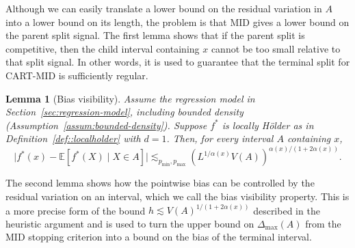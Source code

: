 \documentclass[11pt]{article}
\theoremstyle{plain}
\newtheorem{lemma}[theorem]{Lemma}
\theoremstyle{definition}
\theoremstyle{remark}
\theoremstyle{plain}
\newcommand{\E}{\mathbb{E}}
\newcommand{\1}{\mathbbm{1}}
\begin{document}
Although we can easily translate a lower bound on the residual variation in $A$ into a lower bound on its length, the problem is that MID gives a lower bound on the parent split signal. The first lemma shows that if the parent split is competitive, then the child interval containing $x$ cannot be too small relative to that split signal.
In other words, it is used to guarantee that the terminal split for CART-MID is sufficiently regular.


\begin{lemma}[Bias visibility]
\label{lemma:LH-upper-1d}
Assume the regression model in Section~\ref{sec:regression-model}, including bounded density (Assumption~\ref{assum:bounded-density}). Suppose $f^*$ is locally H\"older as in Definition~\ref{def::localholder} with $d=1$.
Then, for every interval $A$ containing $x$,
\begin{equation}
\label{eq:LH-upper-1d}
\bigl|f^*(x)-\E[f^*(X)\mid X\in A]\bigr|
\lesssim_{p_{\min},p_{\max}}
\left(L^{1/\alpha(x)}V(A)\right)^{\alpha(x)/(1+2\alpha(x))}.
\end{equation}
\end{lemma}

The second lemma shows how the pointwise bias can be controlled by the residual variation on an interval, which we call the bias visibility property.
This is a more precise form of the bound $h \lesssim V(A)^{1/(1+2\alpha(x))}$ described in the heuristic argument and is used to turn the upper bound on $\Delta_{\max}(A)$ from the MID stopping criterion into a bound on the bias of the terminal interval.
\end{document}
